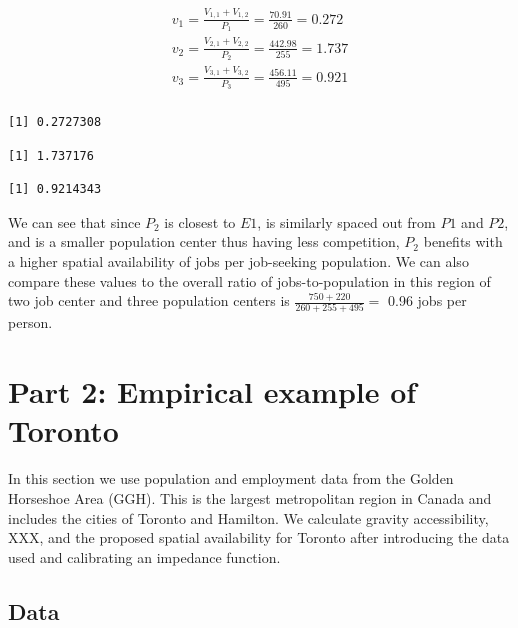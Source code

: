 \documentclass[]{elsarticle} %
\begin{document}
\begin{equation}
\label{eq:SA-per-capita-2populations}
\begin{array}{l}
v_{1} = \frac{V_{1,1} + V_{1,2}}{P_1} =  \frac{70.91}{260} = 0.272\\
v_{2} =  \frac{V_{2,1} + V_{2,2}}{P_2} =  \frac{442.98}{255} = 1.737\\
v_{3} =  \frac{V_{3,1} + V_{3,2}}{P_3} =  \frac{456.11}{495} = 0.921\\
\end{array}
\end{equation}

\begin{verbatim}
[1] 0.2727308
\end{verbatim}

\begin{verbatim}
[1] 1.737176
\end{verbatim}

\begin{verbatim}
[1] 0.9214343
\end{verbatim}

We can see that since \(P_2\) is closest to \(E1\), is similarly spaced
out from \(P1\) and \(P2\), and is a smaller population center thus
having less competition, \(P_2\) benefits with a higher spatial
availability of jobs per job-seeking population. We can also compare
these values to the overall ratio of jobs-to-population in this region
of two job center and three population centers is
\(\frac{750+220}{260+255+495}=\) 0.96 jobs per person.

\hypertarget{part-2-empirical-example-of-toronto}{%
\section{Part 2: Empirical example of
Toronto}\label{part-2-empirical-example-of-toronto}}

In this section we use population and employment data from the Golden
Horseshoe Area (GGH). This is the largest metropolitan region in Canada
and includes the cities of Toronto and Hamilton. We calculate gravity
accessibility, XXX, and the proposed spatial availability for Toronto
after introducing the data used and calibrating an impedance function.

\hypertarget{data}{%
\subsection{Data}\label{data}}
\end{document}
